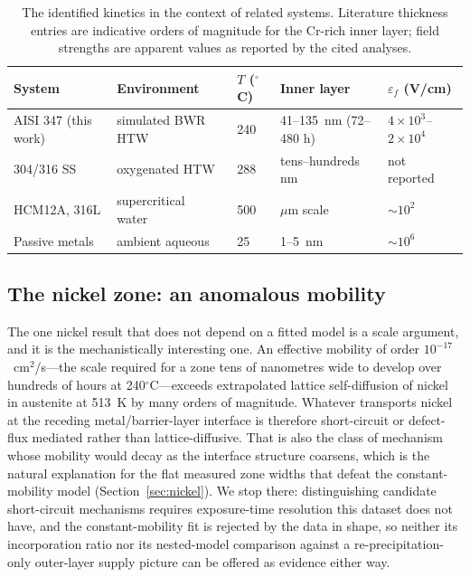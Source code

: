 \documentclass[preprint,12pt]{elsarticle}
\begin{document}
\begin{table}[htbp]
\centering
\caption{The identified kinetics in the context of related systems.
Literature thickness entries are indicative orders of magnitude for the
Cr-rich inner layer; field strengths are apparent values as reported by
the cited analyses.}
\label{tab:context}
\footnotesize
\setlength{\tabcolsep}{4pt}
\scriptsize
\begin{tabular}{lllll}
\toprule
System & Environment & $T$ ($^\circ$C) & Inner layer & $\varepsilon_f$ (V/cm) \\
\midrule
AISI 347 (this work) & simulated BWR HTW & 240 & 41--135~nm (72--480 h) & $4\times10^3$--$2\times10^4$ \\
304/316 SS & oxygenated HTW~\citep{kuang2010oxidation,kim1999oxide} & 288 & tens--hundreds nm & not reported \\
HCM12A, 316L & supercritical water~\citep{li2020scwpdm} & 500 & $\mu$m scale & $\sim10^2$ \\
Passive metals & ambient aqueous~\citep{cabrera1949oxidation} & 25 & 1--5~nm & $\sim10^6$ \\
\bottomrule
\end{tabular}
\end{table}

\subsection{The nickel zone: an anomalous mobility}

The one nickel result that does not depend on a fitted model is a scale
argument, and it is the mechanistically interesting one. An effective
mobility of order $10^{-17}$~cm$^2$/s---the scale required for a
zone tens of nanometres wide to develop over hundreds of hours at
240$^\circ$C---exceeds extrapolated lattice self-diffusion of nickel in
austenite at 513~K by many orders of magnitude. Whatever transports
nickel at the receding metal/barrier-layer interface is therefore
short-circuit or defect-flux mediated rather than lattice-diffusive.
That is also the class of mechanism whose mobility would decay as the
interface structure coarsens, which is the natural explanation for the
flat measured zone widths that defeat the constant-mobility model
(Section~\ref{sec:nickel}). We stop there: distinguishing candidate
short-circuit mechanisms requires exposure-time resolution this dataset
does not have, and the constant-mobility fit is rejected by the data in
shape, so neither its incorporation ratio nor its nested-model
comparison against a re-precipitation-only outer-layer supply picture
can be offered as evidence either way.
\end{document}
